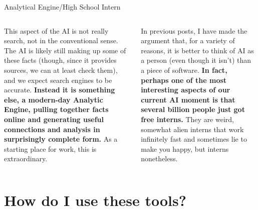 \documentclass[aspectratio=169]{beamer}
\begin{document}
\begin{frame}{Analytical Engine/High School Intern}
\begin{columns}[t]
    \begin{column}{.5\textwidth}
        This aspect of the AI is not really search, not in the conventional sense. The AI is likely still making up some of these facts (though, since it provides sources, we can at least check them), and we expect search engines to be accurate. \textbf{Instead it is something else, a modern-day Analytic Engine, pulling together facts online and generating useful connections and analysis in surprisingly complete form.} As a starting place for work, this is extraordinary. \parencite{Mollick2023-sj}
    \end{column}
    \begin{column}{.5\textwidth}
        In previous posts, I have made the argument that, for a variety of reasons, it is better to think of AI as a person (even though it isn’t) than a piece of software. \textbf{In fact, perhaps one of the most interesting aspects of our current AI moment is that several billion people just got free interns.} They are weird, somewhat alien interns that work infinitely fast and sometimes lie to make you happy, but interns nonetheless. \parencite{Mollick2023-il}
    \end{column}
\end{columns}
    
		
\end{frame}

\section{How do I use these tools?}
\end{document}
